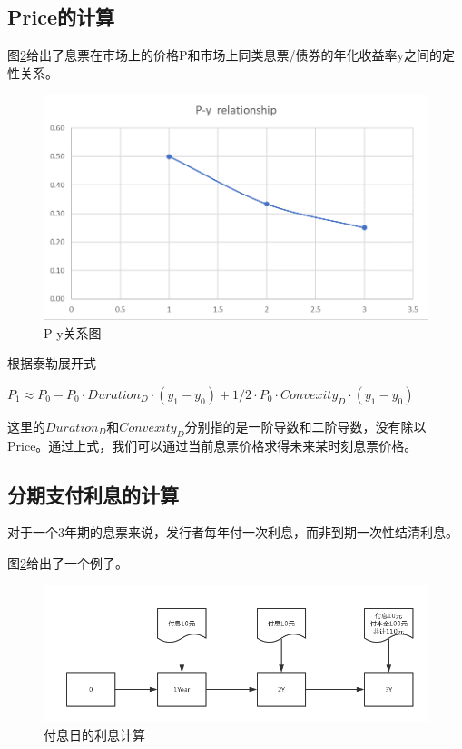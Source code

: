 \subsection{Price的计算}
图\ref{fig:sys.param}给出了息票在市场上的价格P和市场上同类息票/债券的年化收益率y之间的定性关系。

\begin{figure}[htbp]
\begin{center}
\includegraphics[width=16cm]{img//P_y_Relation.PNG}
\caption{P-y关系图}
\label{fig:sys.param}
\end{center}
\end{figure}

根据泰勒展开式

$P_1 \approx P_0-P_0 \cdot {Duration_D} \cdot (y_1-y_0 )+1/2 \cdot {P_0}\cdot {Convexity_D} \cdot (y_1-y_0 )$

这里的$Duration_D$和$Convexity_D$分别指的是一阶导数和二阶导数，没有除以Price。通过上式，我们可以通过当前息票价格求得未来某时刻息票价格。

\subsection{分期支付利息的计算}
对于一个3年期的息票来说，发行者每年付一次利息，而非到期一次性结清利息。

图\ref{fig:sys.param}给出了一个例子。
\begin{figure}[htbp]
\begin{center}
\includegraphics[width=16cm]{img//Interest_Calc.PNG}
\caption{付息日的利息计算}
\label{fig:sys.param}
\end{center}
\end{figure}

